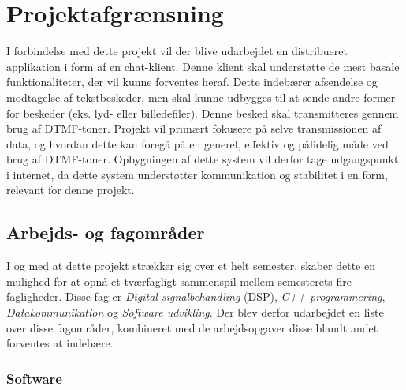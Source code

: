 \section{Projektafgrænsning}
I forbindelse med dette projekt vil der blive udarbejdet en distribueret applikation i form af en chat-klient. Denne klient skal understøtte de mest basale funktionaliteter, der vil kunne forventes heraf. Dette indebærer afsendelse og modtagelse af tekstbeskeder, men skal kunne udbygges til at sende andre former for beskeder (eks. lyd- eller billedefiler). Denne besked skal transmitteres gennem brug af DTMF-toner. 
Projekt vil primært fokusere på selve transmissionen af data, og hvordan dette kan foregå på en generel, effektiv og pålidelig måde ved brug af DTMF-toner. Opbygningen af dette system vil derfor tage udgangspunkt i internet, da dette system understøtter kommunikation og stabilitet i en form, relevant for denne projekt. 



\subsection{Arbejds- og fagområder}

I og med at dette projekt strækker sig over et helt semester, skaber dette en mulighed for at opnå et tværfagligt sammenspil mellem semesterets fire fagligheder. Disse fag er \textit{Digital signalbehandling} (DSP), \textit{ C++ programmering}, \textit{Datakommunikation} og \textit{Software udvikling}. Der blev derfor udarbejdet en liste over disse fagområder, kombineret med de arbejdsopgaver disse blandt andet forventes at indebære.   


\subsubsection{Software}

